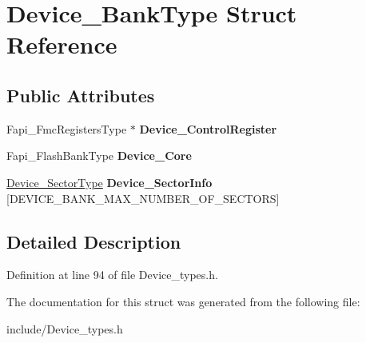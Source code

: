 \hypertarget{structDevice__BankType}{}\section{Device\+\_\+\+Bank\+Type Struct Reference}
\label{structDevice__BankType}
\subsection*{Public Attributes}
\begin{DoxyCompactItemize}
\item 
\mbox{\label{structDevice__BankType_a36211fad634872f704a479d102a01483}} 
Fapi\+\_\+\+Fmc\+Registers\+Type $\ast$ {\bfseries Device\+\_\+\+Control\+Register}
\item 
\mbox{\label{structDevice__BankType_a6db190400cb07b176a92745adcac9f81}} 
Fapi\+\_\+\+Flash\+Bank\+Type {\bfseries Device\+\_\+\+Core}
\item 
\mbox{\label{structDevice__BankType_abd22848f5dc69ba9b1efb3787280685d}} 
\mbox{\hyperlink{structDevice__SectorType}{Device\+\_\+\+Sector\+Type}} {\bfseries Device\+\_\+\+Sector\+Info} \mbox{[}D\+E\+V\+I\+C\+E\+\_\+\+B\+A\+N\+K\+\_\+\+M\+A\+X\+\_\+\+N\+U\+M\+B\+E\+R\+\_\+\+O\+F\+\_\+\+S\+E\+C\+T\+O\+RS\mbox{]}
\end{DoxyCompactItemize}


\subsection{Detailed Description}


Definition at line 94 of file Device\+\_\+types.\+h.



The documentation for this struct was generated from the following file\+:\begin{DoxyCompactItemize}
\item 
include/Device\+\_\+types.\+h\end{DoxyCompactItemize}
